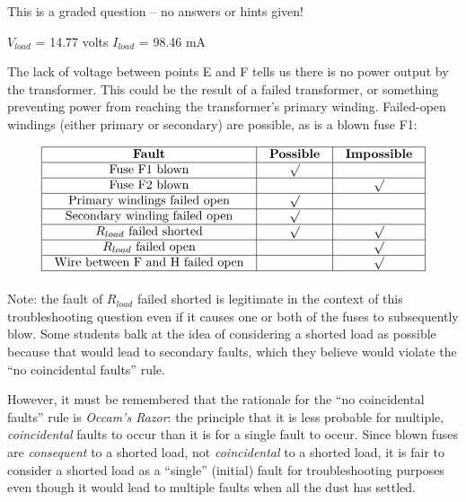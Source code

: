 \vfil 

\eject






This is a graded question -- no answers or hints given!
 






$V_{load}$ = 14.77 volts \hskip 30pt $I_{load}$ = 98.46 mA

\vskip 10pt

The lack of voltage between points E and F tells us there is no power output by the transformer.  This could be the result of a failed transformer, or something preventing power from reaching the transformer's primary winding.  Failed-open windings (either primary or secondary) are possible, as is a blown fuse F1:


$$\vbox{\offinterlineskip
\halign{\strut
\vrule \quad\hfil # \ \hfil & 
\vrule \quad\hfil # \ \hfil & 
\vrule \quad\hfil # \ \hfil \vrule \cr
\noalign{\hrule}
%
{\bf Fault} & {\bf Possible} & {\bf Impossible} \cr
%
\noalign{\hrule}
%
Fuse F1 blown & $\surd$ &  \cr
%
\noalign{\hrule}
%
Fuse F2 blown &  & $\surd$ \cr
%
\noalign{\hrule}
%
Primary windings failed open & $\surd$ &  \cr
%
\noalign{\hrule}
%
Secondary winding failed open & $\surd$ &  \cr
%
\noalign{\hrule}
%
$R_{load}$ failed shorted & $\surd$ & $\surd$ \cr
%
\noalign{\hrule}
%
$R_{load}$ failed open &  & $\surd$ \cr
%
\noalign{\hrule}
%
Wire between F and H failed open &  & $\surd$ \cr
%
\noalign{\hrule}
} %
}$$ %

Note: the fault of $R_{load}$ failed shorted is legitimate in the context of this troubleshooting question even if it causes one or both of the fuses to subsequently blow.  Some students balk at the idea of considering a shorted load as possible because that would lead to secondary faults, which they believe would violate the ``no coincidental faults'' rule.

However, it must be remembered that the rationale for the ``no coincidental faults'' rule is {\it Occam's Razor}: the principle that it is less probable for multiple, {\it coincidental} faults to occur than it is for a single fault to occur.  Since blown fuses are {\it consequent} to a shorted load, not {\it coincidental} to a shorted load, it is fair to consider a shorted load as a ``single'' (initial) fault for troubleshooting purposes even though it would lead to multiple faults when all the dust has settled.

